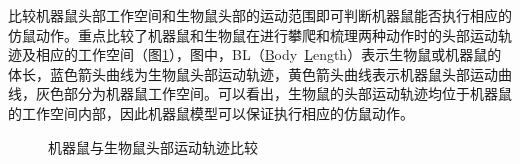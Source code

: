 比较机器鼠头部工作空间和生物鼠头部的运动范围即可判断机器鼠能否执行相应的仿鼠动作。\citeauthor{liMotionEvaluation2017}重点比较了机器鼠和生物鼠在进行攀爬和梳理两种动作时的头部运动轨迹及相应的工作空间（图\ref{figure_comparetrace}），图中，BL（\underline{B}ody~\underline{L}ength）表示生物鼠或机器鼠的体长，蓝色箭头曲线为生物鼠头部运动轨迹，黄色箭头曲线表示机器鼠头部运动曲线，灰色部分为机器鼠工作空间\cite{liMotionEvaluation2017}。可以看出，生物鼠的头部运动轨迹均位于机器鼠的工作空间内部，因此机器鼠模型可以保证执行相应的仿鼠动作。
\begin{figure}[htbp]
  \centering
  \caption{机器鼠与生物鼠头部运动轨迹比较\cite{liMotionEvaluation2017}}\label{figure_comparetrace}
\end{figure} 